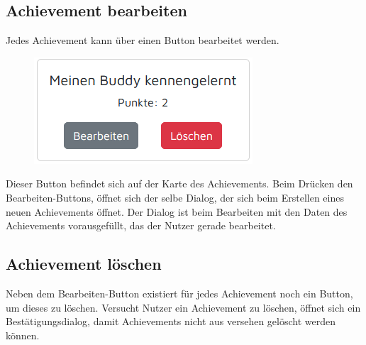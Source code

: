 \documentclass[11pt]{article}
\begin{document}
\subsection{Achievement bearbeiten}
Jedes Achievement kann über einen Button bearbeitet werden.
\begin{figure}
    \centering
    \includegraphics[width=.4\textwidth]{application/achievement_manage.png}
\end{figure}
Dieser Button befindet sich auf der Karte des Achievements.
Beim Drücken den Bearbeiten-Buttons, öffnet sich der selbe Dialog, der sich beim Erstellen eines neuen
Achievements öffnet. Der Dialog ist beim Bearbeiten mit den Daten des Achievements vorausgefüllt, das der Nutzer gerade
bearbeitet.

\subsection{Achievement löschen}
Neben dem Bearbeiten-Button existiert für jedes Achievement noch ein Button, um dieses zu löschen.
Versucht Nutzer ein Achievement zu löschen, öffnet sich ein Bestätigungsdialog, damit Achievements nicht aus versehen
gelöscht werden können.
\end{document}
